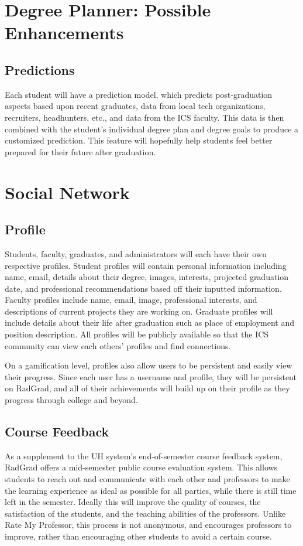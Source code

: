 \section{Degree Planner: Possible Enhancements}
\subsection{Predictions}
Each student will have a prediction model, which predicts post-graduation aspects based upon recent graduates, data from local tech organizations, recruiters, headhunters, etc., and data from the ICS faculty. This data is then combined with the student's individual degree plan and degree goals to produce a customized prediction.  This feature will hopefully help students feel better prepared for their future after graduation.

\section{Social Network}
\subsection{Profile}
Students, faculty, graduates, and administrators will each have their own respective profiles. Student profiles will contain personal information including name, email, details about their degree, images, interests, projected graduation date, and professional recommendations based off their inputted information. Faculty profiles include name, email, image, professional interests, and descriptions of current projects they are working on. Graduate profiles will include details about their life after graduation such as place of employment and position description. All profiles will be publicly available so that the ICS community can view each others' profiles and find connections. 

On a gamification level, profiles also allow users to be persistent and easily view their progress. Since each user has a username and profile, they will be persistent on RadGrad, and all of their achievements will build up on their profile as they progress through college and beyond.
\subsection{Course Feedback}
As a supplement to the UH system's end-of-semester course feedback system, RadGrad offers a mid-semester public course evaluation system. This allows students to reach out and communicate with each other and professors to make the learning experience as ideal as possible for all parties, while there is still time left in the semester. Ideally this will improve the quality of courses, the satisfaction of the students, and the teaching abilities of the professors. Unlike Rate My Professor, this process is not anonymous, and encourages professors to improve, rather than encouraging other students to avoid a certain course. 
